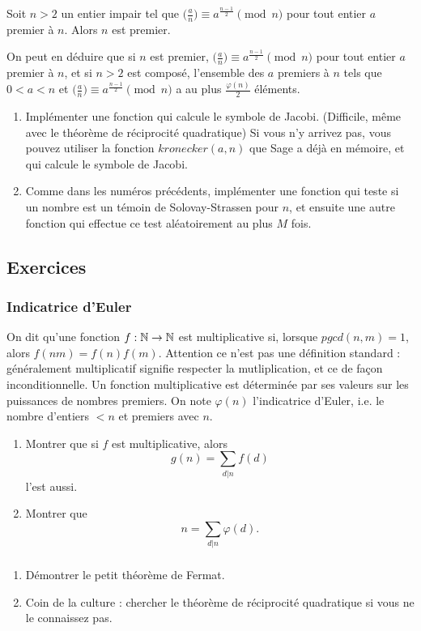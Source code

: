 \begin{thm}
Soit $n>2$ un entier impair tel que $\big(\frac{a}{n}\big)\equiv a^{\frac{n-1}{2}}\pmod n$ pour tout entier $a$ premier à $n$. Alors $n$ est premier. 
\end{thm}

On peut en déduire que si $n$ est premier, $\big(\frac{a}{n}\big)\equiv a^{\frac{n-1}{2}}\pmod n$ pour tout entier $a$ premier à $n$, et si $n>2$ est composé, l'ensemble des $a$ premiers à $n$ tels que $0<a<n$ et $\big(\frac{a}{n}\big)\equiv a^{\frac{n-1}{2}}\pmod n$ a au plus $\frac{\varphi(n)}{2}$ éléments.

\begin{enumerate}
\item Implémenter une fonction qui calcule le symbole de Jacobi. (Difficile, même avec le théorème de réciprocité quadratique) Si vous n'y arrivez pas, vous pouvez utiliser la fonction $kronecker(a,n)$ que Sage a déjà en mémoire, et qui calcule le symbole de Jacobi.
\item Comme dans les numéros précédents, implémenter une fonction qui teste si un nombre est un témoin de Solovay-Strassen pour $n$, et ensuite une autre fonction qui effectue ce test aléatoirement au plus $M$ fois.
\end{enumerate}

\subsection{Exercices}

\subsubsection{Indicatrice d'Euler}

On dit qu'une fonction $f: \mathbb N\rightarrow \mathbb N$ est multiplicative si, lorsque $pgcd(n,m)=1$, alors $f(nm)=f(n)f(m)$. Attention ce n'est pas une définition standard : généralement multiplicatif signifie respecter la mutliplication, et ce de façon inconditionnelle. Un fonction multiplicative est déterminée par ses valeurs sur les puissances de nombres premiers. On note $\varphi(n)$ l'indicatrice d'Euler, i.e. le nombre d'entiers $<n$ et premiers avec $n$.

\begin{enumerate}
\item Montrer que si $f$ est multiplicative, alors 
\[g(n)=\sum_{d|n} f(d)\]
l'est aussi.
\item Montrer que \[n=\sum_{d|n}\varphi(d).\]
\end{enumerate} 

\subsubsection{}

\begin{enumerate}
\item Démontrer le petit théorème de Fermat.
\item Coin de la culture : chercher le théorème de réciprocité quadratique si vous ne le connaissez pas.
\end{enumerate}